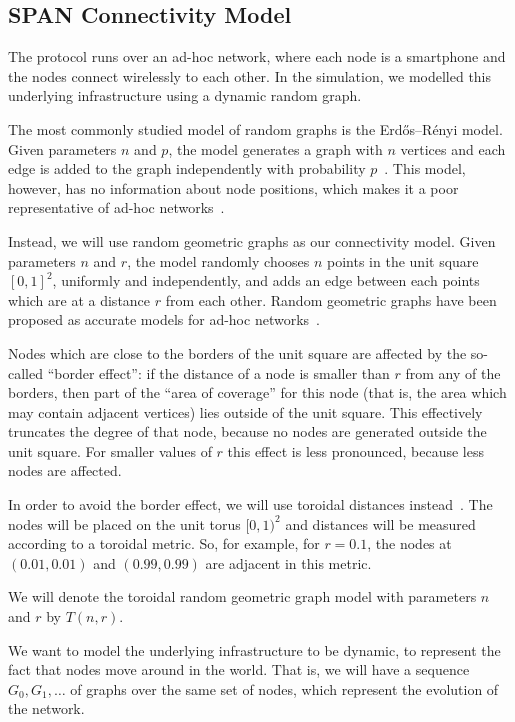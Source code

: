 \subsection{SPAN Connectivity Model}

The protocol runs over an ad-hoc network,
where each node is a smartphone
and the nodes connect wirelessly to each other.
In the simulation,
we modelled this underlying infrastructure using a dynamic random graph.

The most commonly studied model of random graphs is the Erdős--Rényi model.
Given parameters $n$ and $p$,
the model generates a graph with $n$ vertices
and each edge is added to the graph independently with probability $p$~\cite{bollobas_2001}.
This model, however,
has no information about node positions,
which makes it a poor representative of ad-hoc networks~\cite{Hekmat2006}.

Instead,
we will use random geometric graphs as our connectivity model.
Given parameters $n$ and $r$,
the model randomly chooses $n$ points in the unit square $[0, 1]^2$,
uniformly and independently,
and adds an edge between each points which are at a distance $r$ from each other.
Random geometric graphs
have been proposed as accurate models for ad-hoc networks~\cite{Kenniche2010,Hekmat2006}.

Nodes which are close to the borders of the unit square
are affected by the so-called ``border effect'':
if the distance of a node is smaller than $r$
from any of the borders,
then part of the ``area of coverage'' for this node
(that is,
the area which may contain adjacent vertices)
lies outside of the unit square.
This effectively truncates the degree of that node,
because no nodes are generated outside the unit square.
For smaller values of $r$ this effect is less pronounced,
because less nodes are affected.

In order to avoid the border effect,
we will use toroidal distances instead~\cite{Kenniche2010,Hekmat2006}.
The nodes will be placed on the unit torus $[0, 1)^2$
and distances will be measured according to a toroidal metric.
So,
for example,
for $r = 0.1$,
the nodes at $(0.01, 0.01)$ and $(0.99, 0.99)$ are adjacent in this metric.

We will denote
the toroidal random geometric graph model with parameters $n$ and $r$
by $T(n, r)$.

We want to model the underlying infrastructure to be dynamic,
to represent the fact that nodes move around in the world.
That is,
we will have a sequence $G_0, G_1, \dots$ of graphs over the same set of nodes,
which represent the evolution of the network.

